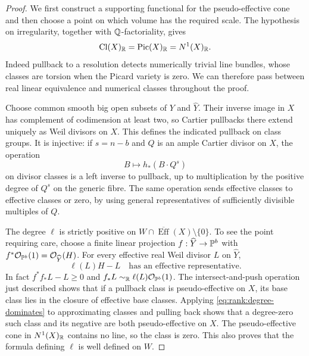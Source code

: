 \begin{proof}
We first construct a supporting functional for the pseudo-effective
cone and then choose a point on which volume has the required scale.
The hypothesis on irregularity, together with $\mathbb Q$-factoriality, gives
\[
 \operatorname{Cl}(X)_{\mathbb R}=\operatorname{Pic}(X)_{\mathbb R}=N^1(X)_{\mathbb R}.
\]
Indeed pullback to a resolution detects numerically trivial line
bundles, whose classes are torsion when the Picard variety is zero.
We can therefore pass between real linear equivalence and numerical
classes throughout the proof.

Choose common smooth big open subsets of $Y$ and $\widehat Y$.
Their inverse image in $X$ has complement of codimension at least two,
so Cartier pullbacks there extend uniquely as Weil divisors on $X$.
This defines the indicated pullback on class groups.  It is injective:
if $s=n-b$ and $Q$ is an ample Cartier divisor on $X$, the operation
\[
 B\longmapsto h_*(B\cdot Q^s)
\]
on divisor classes is a left inverse to pullback, up to multiplication
by the positive degree of $Q^s$ on the generic fibre.  The same
operation sends effective classes to effective classes or zero, by
using general representatives of sufficiently divisible multiples of
$Q$.

The degree $\ell$ is strictly positive on
$W\cap\overline{\operatorname{Eff}}(X)\setminus\{0\}$.
To see the point requiring care, choose a finite linear projection
$f:\widehat Y\to\mathbb P^b$ with $f^*\mathcal O_{\mathbb P^b}(1)=\mathcal O_{\widehat Y}(H)$.
For every effective real Weil divisor $L$ on $\widehat Y$,
\begin{equation}\label{eq:rank:degree-dominates}
 \ell(L)H-L\quad\text{has an effective representative}.
\end{equation}
In fact $f^*f_*L-L\ge0$ and
$f_*L\sim_{\mathbb R}\ell(L)\mathcal O_{\mathbb P^b}(1)$.
The intersect-and-push operation just described shows that if a
pullback class is pseudo-effective on $X$, its base class lies in the
closure of effective base classes.  Applying
\eqref{eq:rank:degree-dominates} to approximating classes and pulling
back shows that a degree-zero such class and its negative are both
pseudo-effective on $X$.  The pseudo-effective cone in $N^1(X)_{\mathbb R}$
contains no line, so the class is zero.  This also proves that the
formula defining $\ell$ is well defined on $W$.


\end{proof}
